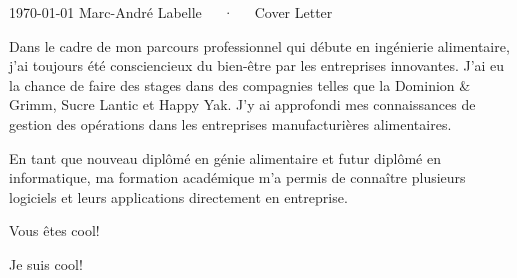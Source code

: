 \documentclass[letterpaper]{marckit-cv}
\begin{document}
\makecvheader[R]

\makecvfooter
  {\today}
  {Marc-André Labelle~~~·~~~Cover Letter}
  {}

\makelettertitle

\begin{cvletter}

    Dans le cadre de mon parcours professionnel qui débute
    en ingénierie alimentaire, j'ai toujours été
    consciencieux du bien-être par les entreprises innovantes.
    J’ai eu la chance de faire des stages dans des compagnies
    telles que la Dominion \& Grimm, Sucre Lantic et Happy Yak.
    J’y ai approfondi mes connaissances de gestion des opérations dans
    les entreprises manufacturières alimentaires.

    En tant que nouveau diplômé en génie alimentaire et futur diplômé
    en informatique, ma formation académique m’a permis de connaître
    plusieurs logiciels et leurs applications directement en entreprise.


    Vous êtes cool!

    Je suis cool!

\end{cvletter}


\makeletterclosing
\end{document}
